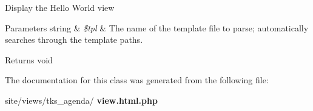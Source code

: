 Display the Hello World view


\begin{DoxyParams}[1]{Parameters}
string & {\em \$tpl} & The name of the template file to parse; automatically searches through the template paths.\\
\hline
\end{DoxyParams}
\begin{DoxyReturn}{Returns}
void 
\end{DoxyReturn}


The documentation for this class was generated from the following file\+:\begin{DoxyCompactItemize}
\item 
site/views/tks\+\_\+agenda/\textbf{ view.\+html.\+php}\end{DoxyCompactItemize}
